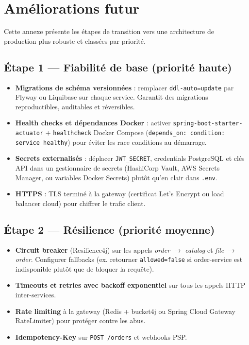 \documentclass[12pt,a4paper]{report}
\begin{document}
\chapter{Améliorations futur}

Cette annexe présente les étapes de transition vers une architecture de production plus robuste et classées par priorité.

\section{Étape 1 — Fiabilité de base (priorité haute)}
\begin{itemize}
  \item \textbf{Migrations de schéma versionnées} : remplacer \texttt{ddl-auto=update} par Flyway ou Liquibase sur chaque service. Garantit des migrations reproductibles, auditables et réversibles.
  \item \textbf{Health checks et dépendances Docker} : activer \texttt{spring-boot-starter-actuator} + \texttt{healthcheck} Docker Compose (\texttt{depends\_on: condition: service\_healthy}) pour éviter les race conditions au démarrage.
  \item \textbf{Secrets externalisés} : déplacer \texttt{JWT\_SECRET}, credentials PostgreSQL et clés API dans un gestionnaire de secrets (HashiCorp Vault, AWS Secrets Manager, ou variables Docker Secrets) plutôt qu'en clair dans \texttt{.env}.
  \item \textbf{HTTPS} : TLS terminé à la gateway (certificat Let's Encrypt ou load balancer cloud) pour chiffrer le trafic client.
\end{itemize}

\section{Étape 2 — Résilience (priorité moyenne)}
\begin{itemize}
  \item \textbf{Circuit breaker} (Resilience4j) sur les appels \textit{order} $\rightarrow$ \textit{catalog} et \textit{file} $\rightarrow$ \textit{order}. Configurer fallbacks (ex. retourner \texttt{allowed=false} si order-service est indisponible plutôt que de bloquer la requête).
  \item \textbf{Timeouts et retries avec backoff exponentiel} sur tous les appels HTTP inter-services.
  \item \textbf{Rate limiting} à la gateway (Redis + bucket4j ou Spring Cloud Gateway RateLimiter) pour protéger contre les abus.
  \item \textbf{Idempotency-Key} sur \texttt{POST /orders} et webhooks PSP.
\end{itemize}
\end{document}
